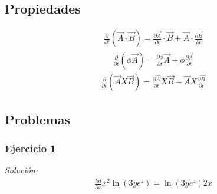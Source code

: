 \documentclass[12pt,openany]{book}
\begin{document}
		\subsection{Propiedades}
		\begin{equation*}
			\begin{split}
				\frac{\partial}{\partial t}\left(\vec{A}\cdot\vec{B}\right)=\frac{\partial \vec{A}}{\partial t}\cdot\vec{B}
																		   +\vec{A}\cdot\frac{\partial \vec{B}}{\partial t}
			\end{split}
		\end{equation*}
		\begin{equation*}
			\begin{split}
				\frac{\partial}{\partial t}(\phi\vec{A})=\frac{\partial \phi}{\partial t}\vec{A}
															 +\phi\frac{\partial \vec{A}}{\partial t}
			\end{split}
		\end{equation*}
		\begin{equation*}
			\begin{split}
				\frac{\partial}{\partial t}\left(\vec{A}X\vec{B}\right)=\frac{\partial \vec{A}}{\partial t}X\vec{B}
																	   +\vec{A}X\frac{\partial \vec{B}}{\partial t}
			\end{split}
		\end{equation*}

		\subsection{Problemas}
			\subsubsection{Ejercicio 1}
				\noindent\textsl{Soluci\'on:}	\\
				\begin{equation*}
					\begin{split}
						\frac{\partial d}{\partial x}x^{2}\ln(3ye^{z})=\ln(3ye^{z})2x
					\end{split}
				\end{equation*}
\end{document}

